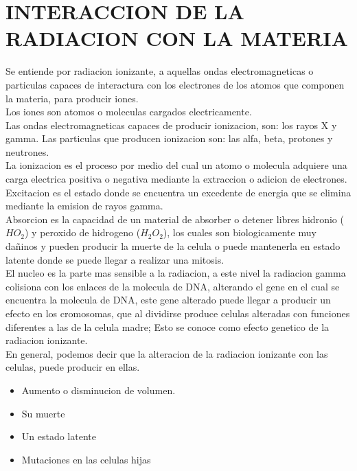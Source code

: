 \documentclass[11pt, oneside]{book}
\begin{document}
\chapter{INTERACCION DE LA RADIACION CON LA MATERIA}
Se entiende por radiacion ionizante, a aquellas ondas electromagneticas o particulas capaces de interactura con los electrones de los atomos que componen la materia, para producir iones.\\

Los iones son atomos o moleculas cargados electricamente.\\

Las ondas electromagneticas capaces de producir ionizacion, son: los rayos X y gamma. Las particulas que producen ionizacion son: las alfa, beta, protones y neutrones.\\

La ionizacion es el proceso por medio del cual un atomo o molecula adquiere una carga electrica positiva o negativa mediante la extraccion o adicion de electrones.\\

Excitacion es el estado donde se encuentra un excedente de energia que se elimina mediante la emision de rayos gamma.\\

Absorcion es la capacidad de un material de absorber o detener libres hidronio ($HO_{2}$) y peroxido de hidrogeno ($H_{2}O_{2}$), los cuales son biologicamente muy dañinos y pueden producir la muerte de la celula o puede mantenerla en estado latente donde se puede llegar a realizar una mitosis.\\

El nucleo es la parte mas sensible a la radiacion, a este nivel la radiacion gamma colisiona con los enlaces de la molecula de DNA, alterando el gene en el cual se encuentra la molecula de DNA, este gene alterado puede llegar a producir un efecto en los cromosomas, que al dividirse produce celulas alteradas con funciones diferentes a las de la celula madre; Esto se conoce como efecto genetico de la radiacion ionizante.\\

En general, podemos decir que la alteracion de la radiacion ionizante con las celulas, puede producir en ellas.
\begin{itemize}
  \item Aumento o disminucion de volumen.
  \item Su muerte
  \item Un estado latente
  \item Mutaciones en las celulas hijas
\end{itemize}
\end{document}
